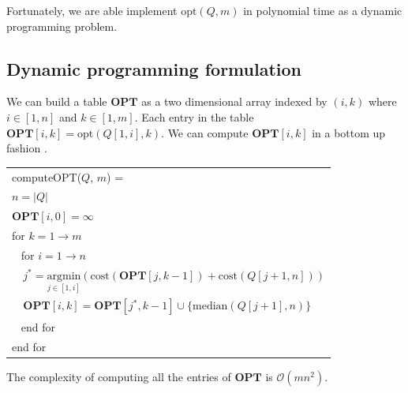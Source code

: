Fortunately, we are able implement $\mathrm{opt}(Q, m)$ in polynomial time as a
dynamic programming problem.

\subsection{Dynamic programming formulation}
\label{sec:dynamic}

We can build a table $\mathbf{OPT}$ as a two dimensional array
indexed by $(i, k)$ where $i\in [1, n]$ and $k\in [1, m]$.  Each entry
in the table $\mathbf{OPT}[i,k] = \mathrm{opt}(Q[1,i], k)$.
We can compute $\mathbf{OPT}[i,k]$ in a bottom up fashion \cite{kossmann2000iterative}.

\vspace{1em}
{\small
\begin{tabular}{|l|} \hline
    computeOPT($Q$, $m$) = \\
    \verb|| $n = |Q|$ \\
    \verb|| $\mathbf{OPT}[i, 0] = \infty$ \\
    \verb|| for $k = 1 \to m$ \\
    \verb| | for $i = 1 \to n$ \\
    \verb|  | $j^* = \underset{j\in[1,i]}{\mathrm{argmin}}
                (\mathrm{cost}(\mathbf{OPT}[j,k-1]) + \mathrm{cost}(Q[j+1, n]))$ \\
    \verb|  | $\mathbf{OPT}[i,k] = \mathbf{OPT}[j^*, k-1] \cup \{\mathrm{median}(Q[j+1], n)\}$ \\
    \verb| | end for \\
    \verb|| end for \\ \hline
\end{tabular}
}
\vspace{1em}

\begin{prop}
    The complexity of computing all the entries of $\mathbf{OPT}$ is
    $\mathcal{O}(mn^2)$.
\end{prop}

